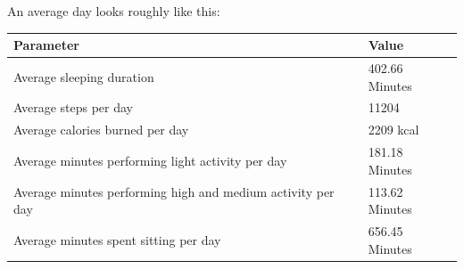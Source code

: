 \documentclass[
]{article}
\begin{document}
An average day looks roughly like this:

\begin{longtable}[]{@{}ll@{}}
\toprule
\begin{minipage}[b]{0.60\columnwidth}\raggedright
Parameter\strut
\end{minipage} & \begin{minipage}[b]{0.34\columnwidth}\raggedright
Value\strut
\end{minipage}\tabularnewline
\midrule
\endhead
\begin{minipage}[t]{0.60\columnwidth}\raggedright
Average sleeping duration\strut
\end{minipage} & \begin{minipage}[t]{0.34\columnwidth}\raggedright
402.66 Minutes\strut
\end{minipage}\tabularnewline
\begin{minipage}[t]{0.60\columnwidth}\raggedright
Average steps per day\strut
\end{minipage} & \begin{minipage}[t]{0.34\columnwidth}\raggedright
11204\strut
\end{minipage}\tabularnewline
\begin{minipage}[t]{0.60\columnwidth}\raggedright
Average calories burned per day\strut
\end{minipage} & \begin{minipage}[t]{0.34\columnwidth}\raggedright
2209 kcal\strut
\end{minipage}\tabularnewline
\begin{minipage}[t]{0.60\columnwidth}\raggedright
Average minutes performing light activity per day\strut
\end{minipage} & \begin{minipage}[t]{0.34\columnwidth}\raggedright
181.18 Minutes\strut
\end{minipage}\tabularnewline
\begin{minipage}[t]{0.60\columnwidth}\raggedright
Average minutes performing high and medium activity per day\strut
\end{minipage} & \begin{minipage}[t]{0.34\columnwidth}\raggedright
113.62 Minutes\strut
\end{minipage}\tabularnewline
\begin{minipage}[t]{0.60\columnwidth}\raggedright
Average minutes spent sitting per day\strut
\end{minipage} & \begin{minipage}[t]{0.34\columnwidth}\raggedright
656.45 Minutes\strut
\end{minipage}\tabularnewline
\bottomrule
\end{longtable}
\end{document}
